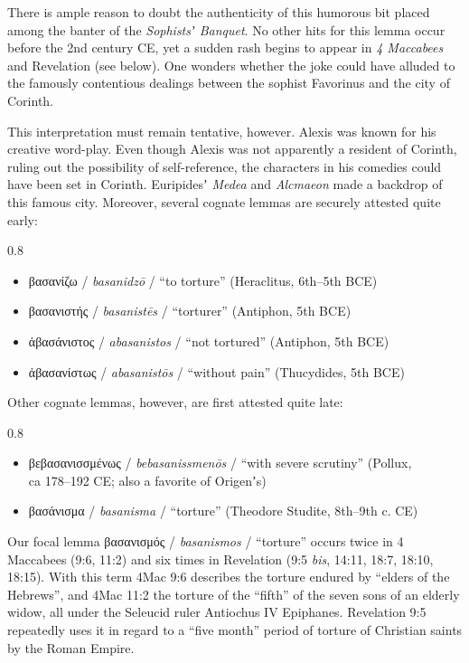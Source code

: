 There is ample reason to doubt the authenticity of this %
humorous bit placed among the banter of the \textit{Sophistsʼ Banquet}. %
No other hits for this lemma occur before the 2nd century CE, %
yet a sudden rash begins to appear in \textit{4 Maccabees} and Revelation (see below). %
One wonders whether the joke could have alluded to the famously contentious %
dealings between the sophist Favorinus and the city of Corinth. %

This interpretation must remain tentative, however. %
Alexis was known for his creative word-play. %
Even though Alexis was not apparently a resident of Corinth, %
ruling out the possibility of self-reference, %
the characters in his comedies could have been set in Corinth. %
Euripidesʼ \textit{Medea} and \textit{Alcmaeon} made a backdrop of this famous city. %
Moreover, several cognate lemmas are securely attested quite early: %
\begin{spacing}{0.8}
\begin{small}
\begin{itemize}
\item βασανίζω / \textit{basanidzō} / “to torture” (Heraclitus, 6th--5th BCE)%
\item βασανιστής / \textit{basanistēs} / “torturer” (Antiphon, 5th BCE)%
\item ἀβασάνιστος / \textit{abasanistos} / “not tortured” (Antiphon, 5th BCE)%
\item ἀβασανίστως / \textit{abasanistōs} / “without pain” (Thucydides, 5th BCE)%
\end{itemize}
\end{small}
\end{spacing} 

\noindent{}Other cognate lemmas, however, are first attested quite late: %

\begin{spacing}{0.8}
\begin{small}
\begin{itemize}
\item βεβασανισσμένως / \textit{bebasanissmenōs} / “with severe scrutiny” (Pollux, \\ %
 \makebox[2em][l]{} ca 178--192 CE; also a favorite of Origenʼs)%
\item βασάνισμα / \textit{basanisma} / “torture” (Theodore Studite, 8th--9th c. CE)%
\end{itemize}
\end{small}
\end{spacing} 

Our focal lemma βασανισμός / \textit{basanismos} / “torture” occurs twice %
in 4 Maccabees (9:6, 11:2) and six times in Revelation %
(9:5 \textit{bis}, 14:11, 18:7, 18:10, 18:15). %
With this term 4Mac 9:6 describes the torture endured by “elders of the Hebrews”, %
and 4Mac 11:2 the torture of the “fifth” of the seven sons of an elderly widow, %
all under the Seleucid ruler Antiochus IV Epiphanes. %
Revelation 9:5 repeatedly uses it in regard to a “five month” %
period of torture of Christian saints by the Roman Empire. %


